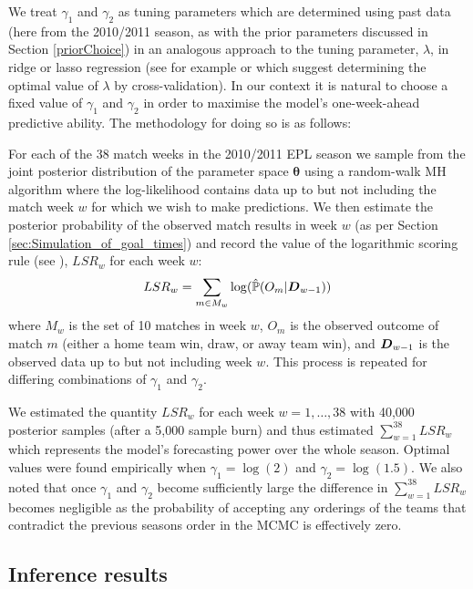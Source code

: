 We treat \(\gamma_1\) and \(\gamma_2\) as tuning parameters which are determined using past data (here from the
2010/2011 season, as with the prior parameters discussed in Section \ref{priorChoice}) in an analogous approach to the
tuning parameter, \(\lambda\), in ridge or lasso regression (see for example \cite{tibshirani1996} or \cite{hastie2009}
which suggest determining the optimal value of \(\lambda\) by cross-validation). In our context it is natural to choose
a fixed value of \(\gamma_1\) and \(\gamma_2\) in order to maximise the model's one-week-ahead predictive ability. The
methodology for doing so is as follows: 

For each of the 38 match weeks in the 2010/2011 \gls{EPL} season we sample from the joint posterior distribution of the
parameter space \(\boldsymbol{\theta}\) using a random-walk \gls{MH} algorithm where the log-likelihood contains data up
to but not including the match week \(w\) for which we wish to make predictions. We then estimate the posterior
probability of the observed match results in week \(w\) (as per Section \ref{sec:Simulation_of_goal_times}) and record
the value of the logarithmic scoring rule (see \cite{dawid2012, gneiting2007}), \(LSR_w\) for each week \(w\):
\begin{align}
LSR_w = \sum_{m \in M_w} \log(\hat{\mathbb{P}}(O_m | \boldsymbol{D}_{w-1}))
\label{eq:LSR}
\end{align}
where \(M_w\) is the set of 10 matches in week \(w\), \(O_m\) is the observed outcome of match \(m\) (either a home
team win, draw, or away team win), and \(\boldsymbol{D}_{w-1}\) is the observed data up to but not including week \(w\). This
process is repeated for differing combinations of \(\gamma_1\) and \(\gamma_2\).

We estimated the quantity \(LSR_w\) for each week \(w = 1, \ldots, 38\) with 40,000 posterior samples (after a 5,000
sample burn) and thus estimated \(\sum_{w=1}^{38} LSR_w\) which represents the model's forecasting power over the whole
season. Optimal values were found empirically when \(\gamma_1 = \log(2)\) and \(\gamma_2 = \log(1.5)\). We also noted
that once \(\gamma_1\) and \(\gamma_2\) become sufficiently large the difference in \(\sum_{w=1}^{38} LSR_w\) becomes
negligible as the probability of accepting any orderings of the teams that contradict the previous seasons order in the
\gls{MCMC} is effectively zero.

\subsection{Inference results}
\label{sec:Inference results}


